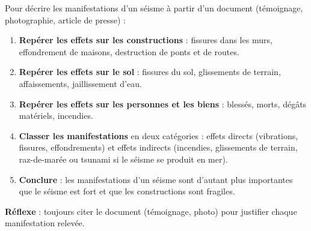 \documentclass[11pt]{article}
\newcommand{\cle}[1]{{\popxbold\color{popdark}#1}}
\begin{document}
\begin{methode}
Pour décrire les manifestations d'un séisme à partir d'un document (témoignage, photographie, article de presse) :
\begin{enumerate}
\item \textbf{Repérer les effets sur les constructions} : fissures dans les murs, effondrement de maisons, destruction de ponts et de routes.
\item \textbf{Repérer les effets sur le sol} : fissures du sol, glissements de terrain, affaissements, jaillissement d'eau.
\item \textbf{Repérer les effets sur les personnes et les biens} : blessés, morts, dégâts matériels, incendies.
\item \textbf{Classer les manifestations} en deux catégories : effets \cle{directs} (vibrations, fissures, effondrements) et effets \cle{indirects} (incendies, glissements de terrain, raz-de-marée ou tsunami si le séisme se produit en mer).
\item \textbf{Conclure} : les manifestations d'un séisme sont d'autant plus importantes que le séisme est fort et que les constructions sont fragiles.
\end{enumerate}
\textbf{Réflexe} : toujours citer le document (témoignage, photo) pour justifier chaque manifestation relevée.
\end{methode}
\end{document}
